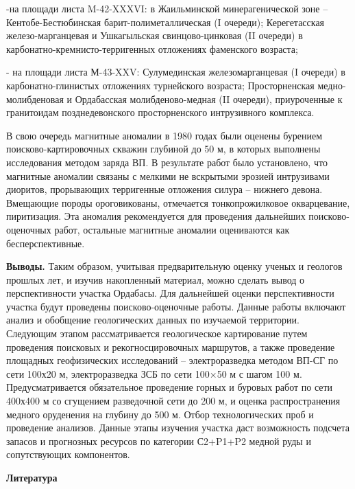 \begin{multicols}{2}
-на площади листа M-42-XXXVI: в Жаильминской минерагенической зоне --
Кентобе-Бестюбинская барит-полиметаллическая (I очереди); Керегетасская
железо-марганцевая и Ушкагыльская свинцово-цинковая (II очереди) в
карбонатно-кремнисто-терригенных отложениях фаменского возраста;

- на площади листа М-43-XXV: Сулумединская железомарганцевая (I очереди)
в карбонатно-глинистых отложениях турнейского возраста; Просторненская
медно-молибденовая и Ордабасская молибденово-медная (II очереди),
приуроченные к гранитоидам позднедевонского просторненского интрузивного
комплекса.

В свою очередь магнитные аномалии в 1980 годах были оценены бурением
поисково-картировочных скважин глубиной до 50 м, в которых выполнены
исследования методом заряда ВП. В результате работ было установлено, что
магнитные аномалии связаны с мелкими не вскрытыми эрозией интрузивами
диоритов, прорывающих терригенные отложения силура -- нижнего девона.
Вмещающие породы ороговикованы, отмечается тонкопрожилковое
окварцевание, пиритизация. Эта аномалия рекомендуется для проведения
дальнейших поисково-оценочных работ, остальные магнитные аномалии
оцениваются как бесперспективные.

{\bfseries Выводы.} Таким образом, учитывая предварительную оценку ученых и
геологов прошлых лет, и изучив накопленный материал, можно сделать вывод
о перспективности участка Ордабасы. Для дальнейшей оценки
перспективности участка будут проведены поисково-оценочные работы.
Данные работы включают анализ и обобщение геологических данных по
изучаемой территории. Следующим этапом рассматривается геологическое
картирование путем проведения поисковых и рекогносцировочных маршрутов,
а также проведение площадных геофизических исследований --
электроразведка методом ВП-СГ по сети 100х20 м, электроразведка ЗСБ по
сети 100×50 м с шагом 100 м. Предусматривается обязательное проведение
горных и буровых работ по сети 400х400 м со сгущением разведочной сети
до 200 м, и оценка распространения медного оруденения на глубину до 500
м. Отбор технологических проб и проведение анализов. Данные этапы
изучения участка даст возможность подсчета запасов и прогнозных ресурсов
по категории С2+P1+P2 медной руды и сопутствующих компонентов.
\end{multicols}

\begin{center}
{\bfseries Литература}
\end{center}


